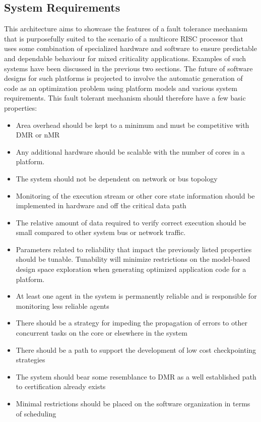 \subsection{System Requirements}
This architecture aims to showcase the features of a fault tolerance mechanism that is purposefully suited to the scenario of a multicore RISC processor that uses some combination of specialized hardware and software to ensure predictable and dependable behaviour for mixed criticality applications. Examples of such systems have been discussed in the previous two sections. The future of software designs for such platforms is projected to involve the automatic generation of code as an optimization problem using platform models and various system requirements. This fault tolerant mechanism should therefore have a few basic properties:
\begin{itemize}
\item{Area overhead should be kept to a minimum and must be competitive with DMR or nMR}
\item{Any additional hardware should be scalable with the number of cores in a platform.}
\item{The system should not be dependent on network or bus topology}
\item{Monitoring of the execution stream or other core state information should be implemented in hardware and off the critical data path}
\item{The relative amount of data required to verify correct execution should be small compared to other system bus or network traffic. }
\item{Parameters related to reliability that impact the previously listed properties should be tunable. Tunability will minimize restrictions on the model-based design space exploration when generating optimized application code for a platform.}
\item{At least one agent in the system is permanently reliable and is responsible for monitoring less reliable agents}
\item{There should be a strategy for impeding the propagation of errors to other concurrent tasks on the core or elsewhere in the system}
\item{There should be a path to support the development of low cost checkpointing strategies}
\item{The system should bear some resemblance to DMR as a well established path to certification already exists}
\item{Minimal restrictions should be placed on the software organization in terms of scheduling}
\end{itemize}

